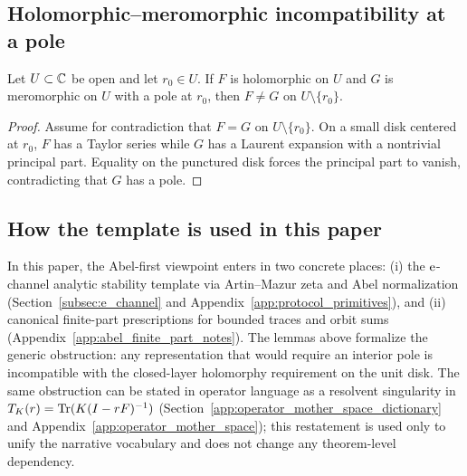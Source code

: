 \subsection{Holomorphic--meromorphic incompatibility at a pole}
\label{subsec:holomorphic_meromorphic_incompatibility}

\begin{lemma}
\label{lem:holomorphic_meromorphic_incompatibility}
\MathTag Let $U\subset\mathbb{C}$ be open and let $r_0\in U$.
If $F$ is holomorphic on $U$ and $G$ is meromorphic on $U$ with a pole at $r_0$, then $F\neq G$ on $U\setminus\{r_0\}$.
\end{lemma}
\begin{proof}
Assume for contradiction that $F=G$ on $U\setminus\{r_0\}$.
On a small disk centered at $r_0$, $F$ has a Taylor series while $G$ has a Laurent expansion with a nontrivial principal part.
Equality on the punctured disk forces the principal part to vanish, contradicting that $G$ has a pole.
\end{proof}

\subsection{How the template is used in this paper}
\label{subsec:pole_barrier_usage_z128}

\AuditTag In this paper, the Abel-first viewpoint enters in two concrete places:
(i) the $\mathrm{e}$-channel analytic stability template via Artin--Mazur zeta and Abel normalization (Section~\ref{subsec:e_channel} and Appendix~\ref{app:protocol_primitives}),
and (ii) canonical finite-part prescriptions for bounded traces and orbit sums (Appendix~\ref{app:abel_finite_part_notes}).
The lemmas above formalize the generic obstruction: any representation that would require an interior pole is incompatible with the closed-layer holomorphy requirement on the unit disk.
\AuditTag The same obstruction can be stated in operator language as a resolvent singularity in $T_K(r)=\mathrm{Tr}(K(I-rF)^{-1})$ (Section~\ref{app:operator_mother_space_dictionary} and Appendix~\ref{app:operator_mother_space}); this restatement is used only to unify the narrative vocabulary and does not change any theorem-level dependency.


